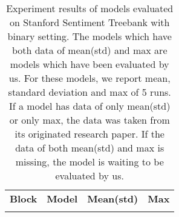 \begin{table}[H]
    \centering
    \caption{Experiment results of models evaluated on Stanford Sentiment Treebank with binary setting. 
The models which have both data of mean(std) and max are models which have been evaluated by us. 
For these models, we report mean, standard deviation and max of 5 runs. 
If a model has data of only mean(std) or only max, the data was taken from its originated research paper. 
If the data of both mean(std) and max is missing, the model is waiting to be evaluated by us.}
    \label{table:experimentresult}
    \begin{tabular}{c|lll}
    \textbf{Block}    & \textbf{Model}  & \textbf{Mean(std)} & \textbf{Max}   \\ 
\Xhline{3\arrayrulewidth}
\Xhline{3\arrayrulewidth}


\end{tabular}
\end{table}
